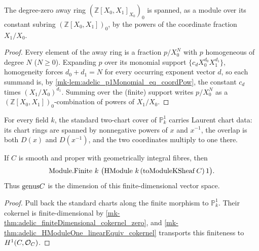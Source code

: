 \begin{theorem}
  \label{mk-thm:adelic_span_p1CoordAway_pow_top}
  \leanok
  The degree-zero away ring \((\mathbb{Z}[X_0,X_1]_{X_0})_0\) is spanned,
  as a module over its constant subring \((\mathbb{Z}[X_0,X_1])_0\), by
  the powers of the coordinate fraction \(X_1/X_0\).
\end{theorem}
\begin{proof}
  \leanok
  Every element of the away ring is a fraction \(p/X_0^N\) with \(p\)
  homogeneous of degree \(N\) (\(N \ge 0\)). Expanding \(p\) over its
  monomial support \(\{c_d X_0^{d_0} X_1^{d_1}\}\), homogeneity forces
  \(d_0 + d_1 = N\) for every occurring exponent vector \(d\), so each
  summand is, by \ref{mk-lem:adelic_p1Monomial_eq_coordPow}, the constant
  \(c_d\) times \((X_1/X_0)^{d_1}\). Summing over the (finite) support
  writes \(p/X_0^N\) as a \((\mathbb{Z}[X_0,X_1])_0\)-combination of
  powers of \(X_1/X_0\).
\end{proof}

\begin{theorem}
  \label{mk-thm:adelic_P1_laurent_chart_data}
  \leanok
  For every field \(k\), the standard two-chart cover of
  \(\mathbb P^1_k\) carries Laurent chart data: its chart rings are
  spanned by nonnegative powers of \(x\) and \(x^{-1}\), the overlap is
  both \(D(x)\) and \(D(x^{-1})\), and the two coordinates multiply to
  one there.
\end{theorem}

\begin{theorem}
  \label{mk-thm:adelic_module_finite_genus}
  \leanok
  If \(C\) is smooth and proper with geometrically integral fibres, then
  \[
    \mathrm{Module}.\mathrm{Finite}\ k\ \bigl(\operatorname{HModule}\, k\, (\operatorname{toModuleKSheaf} C)\, 1\bigr).
  \]
  Thus \(\mathrm{genus} C\) is the dimension of this finite-dimensional vector
  space.
\end{theorem}
\begin{proof}
  \leanok
  Pull back the standard charts along the finite morphism to
  \(\mathbb P^1_k\).  Their cokernel is finite-dimensional by
  \ref{mk-thm:adelic_finiteDimensional_cokernel_zero}, and
  \ref{mk-thm:adelic_HModuleOne_linearEquiv_cokernel} transports this
  finiteness to \(H^1(C,\mathcal{O}_{C})\).
\end{proof}

